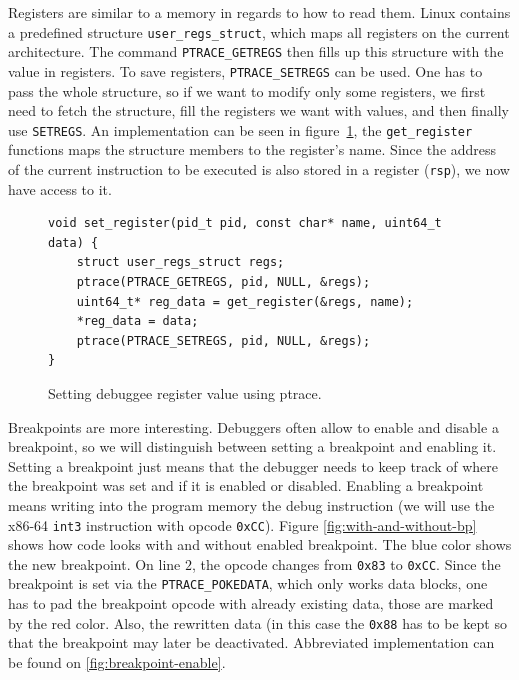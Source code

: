 Registers are similar to a memory in regards to how to read them. Linux
contains a predefined structure \texttt{user\_regs\_struct}, which maps all
registers on the current architecture. The command \texttt{PTRACE\_GETREGS}
then fills up this structure with the value in registers. To save registers,
\texttt{PTRACE\_SETREGS} can be used. One has to pass the whole structure, so
if we want to modify only some registers, we first need to fetch the structure,
fill the registers we want with values, and then finally use \texttt{SETREGS}.
An implementation can be seen in figure~\ref{fig:set-register}, the
\texttt{get\_register} functions maps the structure members to the register's
name. Since the address of the current instruction to be executed is also
stored in a register (\texttt{rsp}), we now have access to it.

\begin{figure}
    \begin{verbatim}
void set_register(pid_t pid, const char* name, uint64_t data) {
    struct user_regs_struct regs;
    ptrace(PTRACE_GETREGS, pid, NULL, &regs);
    uint64_t* reg_data = get_register(&regs, name);
    *reg_data = data;
    ptrace(PTRACE_SETREGS, pid, NULL, &regs);
}
    \end{verbatim}
    \caption{Setting debuggee register value using ptrace.}
    \label{fig:set-register}
\end{figure}

Breakpoints are more interesting. Debuggers often allow to enable and disable a
breakpoint, so we will distinguish between setting a breakpoint and enabling
it. Setting a breakpoint just means that the debugger needs to keep track of
where the breakpoint was set and if it is enabled or disabled. Enabling a
breakpoint means writing into the program memory the debug instruction (we will
use the x86-64 \texttt{int3} instruction with opcode \texttt{0xCC}). Figure
\ref{fig:with-and-without-bp} shows how code looks with and without enabled
breakpoint. The blue color shows the new breakpoint. On line $2$, the opcode
changes from \texttt{0x83} to \texttt{0xCC}. Since the breakpoint is set via
the \texttt{PTRACE\_POKEDATA}, which only works data blocks, one has to pad the
breakpoint opcode with already existing data, those are marked by the red
color. Also, the rewritten data (in this case the \texttt{0x88} has to be kept
so that the breakpoint may later be deactivated. Abbreviated implementation can
be found on \ref{fig:breakpoint-enable}.

